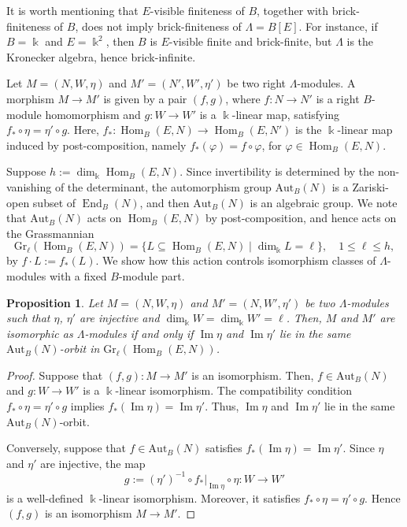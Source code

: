 \documentclass[a4,12pt]{amsart}
\numberwithin{equation}{section} %
\def\Hom{\operatorname{Hom}} %
\def\End{\operatorname{End}} %
\def\Im{\operatorname{Im}} %
\def\Gr{\mathrm{Gr}} %
\def\Aut{\mathrm{Aut}} %
\newtheorem{proposition}[theorem]{Proposition} %
\theoremstyle{definition} %
\begin{document}
It is worth mentioning that $E$-visible finiteness of $B$, together with brick-finiteness of $B$, does not imply brick-finiteness of $\Lambda=B[E]$. For instance, if $B=\Bbbk$ and $E=\Bbbk^2$, then $B$ is $E$-visible finite and brick-finite, but $\Lambda$ is the Kronecker algebra, hence brick-infinite. 

Let $M=(N,W,\eta)$ and $M'=(N',W',\eta')$ be two right $\Lambda$-modules. A morphism $M\to M'$ is given by a pair $(f,g)$, where $f\colon N\to N'$ is a right $B$-module homomorphism and $g\colon W\to W'$ is a $\Bbbk$-linear map, satisfying $f_*\circ\eta=\eta'\circ g$. Here, $f_*\colon \Hom_B(E,N)\to\Hom_B(E,N')$ is the $\Bbbk$-linear map induced by post-composition, namely $f_*(\varphi)=f\circ\varphi$, for $\varphi\in \Hom_B(E,N)$. 

Suppose $h:=\dim_{\Bbbk} \Hom_B(E,N)$. Since invertibility is determined by the non-vanishing of the determinant, the automorphism group $\Aut_B(N)$ is a Zariski-open subset of $\End_B(N)$, and then $\Aut_B(N)$ is an algebraic group. We note that $\Aut_B(N)$ acts on $\Hom_B(E,N)$ by post-composition, and hence acts on the Grassmannian
\[
\Gr_{\ell}(\Hom_B(E,N)) =\bigl\{
L\subseteq \Hom_B(E,N) \mid \dim_{\Bbbk}L=\ell\bigr\},
\quad 1\leq \ell\leq h,
\]
by $f\cdot L:=f_*(L)$. We show how this action controls isomorphism classes of $\Lambda$-modules with a fixed $B$-module part.

\begin{proposition}\label{prop::iso-orbit}
Let $M=(N,W,\eta)$ and $M'=(N,W',\eta')$ be two $\Lambda$-modules such that $\eta$, $\eta'$ are injective and $\dim_{\Bbbk}W=\dim_{\Bbbk}W'=\ell$. Then, $M$ and $M'$ are isomorphic as $\Lambda$-modules if and only if $\Im\eta$ and $\Im\eta'$ lie in the same $\Aut_B(N)$-orbit in $\Gr_{\ell}(\Hom_B(E,N))$.
\end{proposition}
\begin{proof}
Suppose that $(f,g)\colon M\to M'$ is an isomorphism. Then, $f\in\Aut_B(N)$ and $g\colon W\to W'$ is a $\Bbbk$-linear isomorphism.
The compatibility condition $f_*\circ\eta=\eta'\circ g$ implies $f_*(\Im\eta)=\Im\eta'$. Thus, $\Im\eta$ and $\Im\eta'$ lie in the same $\Aut_B(N)$-orbit.

Conversely, suppose that $f\in\Aut_B(N)$ satisfies $f_*(\Im\eta)=\Im\eta'$. Since $\eta$ and $\eta'$ are injective, the map
\[
g:=(\eta')^{-1}\circ f_*|_{\Im\eta}\circ\eta
\colon W\to W'
\]
is a well-defined $\Bbbk$-linear isomorphism. Moreover, it satisfies $f_*\circ\eta=\eta'\circ g$. Hence $(f,g)$ is an isomorphism $M\to M'$.
\end{proof}
\end{document}
